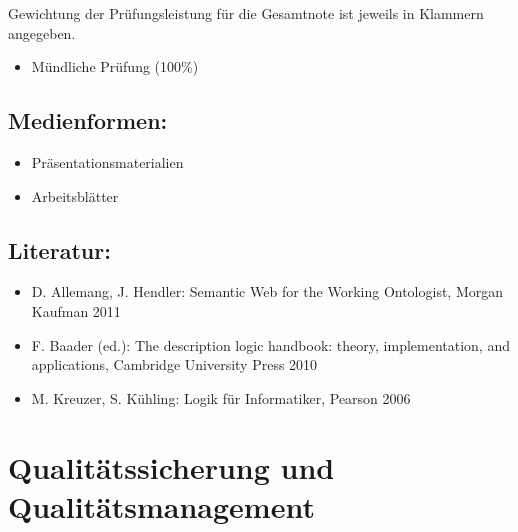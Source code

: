 Gewichtung der Prüfungsleistung für die Gesamtnote ist jeweils in
Klammern angegeben.

\begin{itemize}
\tightlist
\item
  Mündliche Prüfung (100\%)
\end{itemize}

\section*{Medienformen:}\label{medienformen-20}

\begin{itemize}
\tightlist
\item
  Präsentationsmaterialien
\item
  Arbeitsblätter
\end{itemize}

\section*{Literatur:}\label{literatur-20}

\begin{itemize}
\tightlist
\item
  D. Allemang, J. Hendler: Semantic Web for the Working Ontologist,
  Morgan Kaufman 2011
\item
  F. Baader (ed.): The description logic handbook: theory,
  implementation, and applications, Cambridge University Press 2010
\item
  M. Kreuzer, S. Kühling: Logik für Informatiker, Pearson 2006
\end{itemize}

\chapter{Qualitätssicherung und
Qualitätsmanagement}\label{qualituxe4tssicherung-und-qualituxe4tsmanagement}

